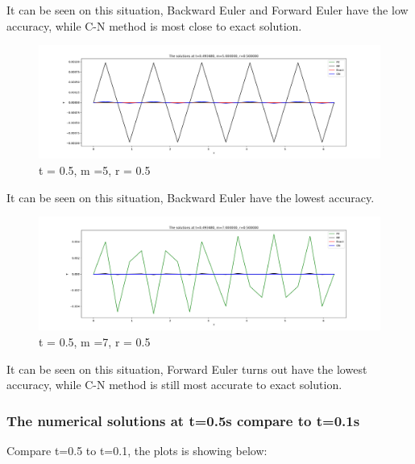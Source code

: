 \documentclass[12pt]{article}
\begin{document}
It can be seen on this situation, Backward Euler and Forward Euler have the low accuracy, while C-N method is most close to exact solution.


\begin{figure}[H] 
\centering 
\includegraphics[scale=0.15]{0.5,0.5,0.5.jpg} 
\caption{t = 0.5, m =5, r = 0.5} 
\label{TDMA Solver code} 
\end{figure}

It can be seen on this situation, Backward Euler have the lowest accuracy.

\begin{figure}[H] 
\centering 
\includegraphics[scale=0.15]{0.5,0.7,0.5.jpg} 
\caption{t = 0.5, m =7, r = 0.5} 
\label{TDMA Solver code} 
\end{figure}

It can be seen on this situation, Forward Euler turns out have the lowest accuracy, while C-N method is still most accurate to exact solution.







\subsubsection{The numerical solutions at t=0.5s compare to t=0.1s}
Compare t=0.5 to t=0.1, the plots is showing below:
\end{document}
